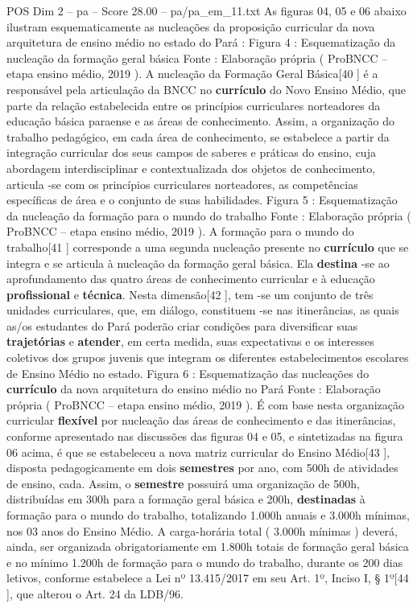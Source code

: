 \begin{textsample}{POS Dim 2 – pa – Score 28.00 – pa/pa\_em\_11.txt}
As figuras 04, 05 e 06 abaixo ilustram esquematicamente as nucleações da proposição curricular da nova arquitetura de ensino médio no estado do Pará : Figura 4 : Esquematização da nucleação da formação geral básica Fonte : Elaboração própria ( ProBNCC – etapa ensino médio, 2019 ).
A nucleação da Formação Geral Básica[40 ] é a responsável pela articulação da BNCC no \textbf{currículo} do Novo Ensino Médio, que parte da relação estabelecida entre os princípios curriculares norteadores da educação básica paraense e as áreas de conhecimento.
Assim, a organização do trabalho pedagógico, em cada área de conhecimento, se estabelece a partir da integração curricular dos seus campos de saberes e práticas do ensino, cuja abordagem interdisciplinar e contextualizada dos objetos de conhecimento, articula -se com os princípios curriculares norteadores, as competências específicas de área e o conjunto de suas habilidades.
Figura 5 : Esquematização da nucleação da formação para o mundo do trabalho Fonte : Elaboração própria ( ProBNCC – etapa ensino médio, 2019 ).
A formação para o mundo do trabalho[41 ] corresponde a uma segunda nucleação presente no \textbf{currículo} que se integra e se articula à nucleação da formação geral básica.
Ela \textbf{destina} -se ao aprofundamento das quatro áreas de conhecimento curricular e à educação \textbf{profissional} e \textbf{técnica}.
Nesta dimensão[42 ], tem -se um conjunto de três unidades curriculares, que, em diálogo, constituem -se nas itinerâncias, as quais as/os estudantes do Pará poderão criar condições para diversificar suas \textbf{trajetórias} e \textbf{atender}, em certa medida, suas expectativas e os interesses coletivos dos grupos juvenis que integram os diferentes estabelecimentos escolares de Ensino Médio no estado.
Figura 6 : Esquematização das nucleações do \textbf{currículo} da nova arquitetura do ensino médio no Pará Fonte : Elaboração própria ( ProBNCC – etapa ensino médio, 2019 ).
É com base nesta organização curricular \textbf{flexível} por nucleação das áreas de conhecimento e das itinerâncias, conforme apresentado nas discussões das figuras 04 e 05, e sintetizadas na figura 06 acima, é que se estabeleceu a nova matriz curricular do Ensino Médio[43 ], disposta pedagogicamente em dois \textbf{semestres} por ano, com 500h de atividades de ensino, cada.
Assim, o \textbf{semestre} possuirá uma organização de 500h, distribuídas em 300h para a formação geral básica e 200h, \textbf{destinadas} à formação para o mundo do trabalho, totalizando 1.000h anuais e 3.000h mínimas, nos 03 anos do Ensino Médio.
A carga-horária total ( 3.000h mínimas ) deverá, ainda, ser organizada obrigatoriamente em 1.800h totais de formação geral básica e no mínimo 1.200h de formação para o mundo do trabalho, durante os 200 dias letivos, conforme estabelece a Lei nº 13.415/2017 em seu Art. 1º, Inciso I, § 1º[44 ], que alterou o Art. 24 da LDB/96.

\end{textsample}
